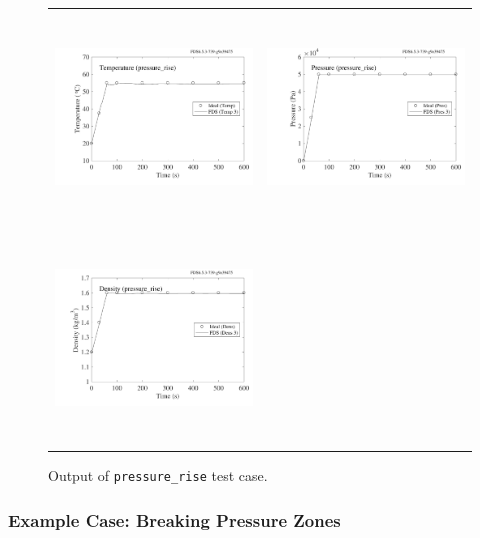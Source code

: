 \documentclass[11pt]{book}
\newcommand{\ct}{\tt\small}
\begin{document}
\begin{figure}[ht]
\begin{tabular*}{\textwidth}{lr}
\includegraphics[height=2.2in]{SCRIPT_FIGURES/pressure_rise_T} &
\includegraphics[height=2.2in]{SCRIPT_FIGURES/pressure_rise_P} \\
\includegraphics[height=2.2in]{SCRIPT_FIGURES/pressure_rise_R} &
\end{tabular*}
\caption[Results of the {\ct pressure\_rise} test case]{Output of {\ct pressure\_rise} test case.}
\label{pressure_rise}
\end{figure}


\subsubsection{Example Case: Breaking Pressure Zones}

\label{zone_break_example}
\end{document}
